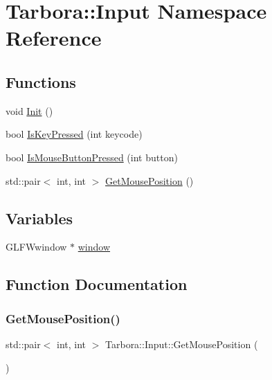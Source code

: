\hypertarget{namespaceTarbora_1_1Input}{}\section{Tarbora\+:\+:Input Namespace Reference}
\label{namespaceTarbora_1_1Input}
\subsection*{Functions}
\begin{DoxyCompactItemize}
\item 
void \hyperlink{namespaceTarbora_1_1Input_a6710b1e8cba486c012634ce3cf3cf583}{Init} ()
\item 
bool \hyperlink{namespaceTarbora_1_1Input_af72f21fbac38d736537e8d4ec3f55e27}{Is\+Key\+Pressed} (int keycode)
\item 
bool \hyperlink{namespaceTarbora_1_1Input_a11865d182572ff7b7f03b14598d2dc5b}{Is\+Mouse\+Button\+Pressed} (int button)
\item 
std\+::pair$<$ int, int $>$ \hyperlink{namespaceTarbora_1_1Input_a2b0e9fb3d1304fba7efd9efeb5364950}{Get\+Mouse\+Position} ()
\end{DoxyCompactItemize}
\subsection*{Variables}
\begin{DoxyCompactItemize}
\item 
G\+L\+F\+Wwindow $\ast$ \hyperlink{namespaceTarbora_1_1Input_a81051c96be1112c892fa9feca5ce2b55}{window}
\end{DoxyCompactItemize}


\subsection{Function Documentation}
\mbox{\label{namespaceTarbora_1_1Input_a2b0e9fb3d1304fba7efd9efeb5364950}} 
\subsubsection{\texorpdfstring{Get\+Mouse\+Position()}{GetMousePosition()}}
{\footnotesize\ttfamily std\+::pair$<$ int, int $>$ Tarbora\+::\+Input\+::\+Get\+Mouse\+Position (\begin{DoxyParamCaption}{ }\end{DoxyParamCaption})}

